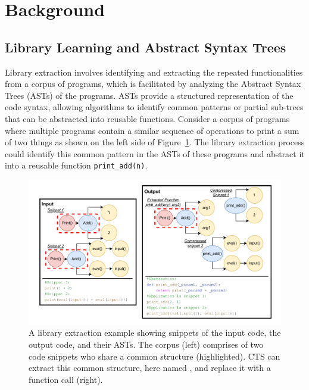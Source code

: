 \section{Background}
\label{sec:background}

\subsection{Library Learning and Abstract Syntax Trees}
Library extraction involves identifying and extracting the repeated functionalities from a corpus of programs, which is facilitated by analyzing the Abstract Syntax Trees (ASTs) of the programs. ASTs provide a structured representation of the code syntax, allowing algorithms to identify common patterns or partial sub-trees that can be abstracted into reusable functions. Consider a corpus of programs where multiple programs contain a similar sequence of operations to print a sum of two things as shown on the left side of Figure~\ref{figure:LibAbsAST}. The library extraction process could identify this common pattern in the ASTs of these programs and abstract it into a reusable function \texttt{print\_add(n)}. 



\begin{figure}[h]
  \centering
  \includegraphics[width=\linewidth]{images/LibAbsAST.pdf}
  \caption{A library extraction example showing snippets of the input code, the output code, and their ASTs. The corpus (left) comprises of two code snippets who share a common structure (highlighted). CTS can extract this common structure, here named , and replace it with a function call (right).  }
  \label{figure:LibAbsAST}
\end{figure}

